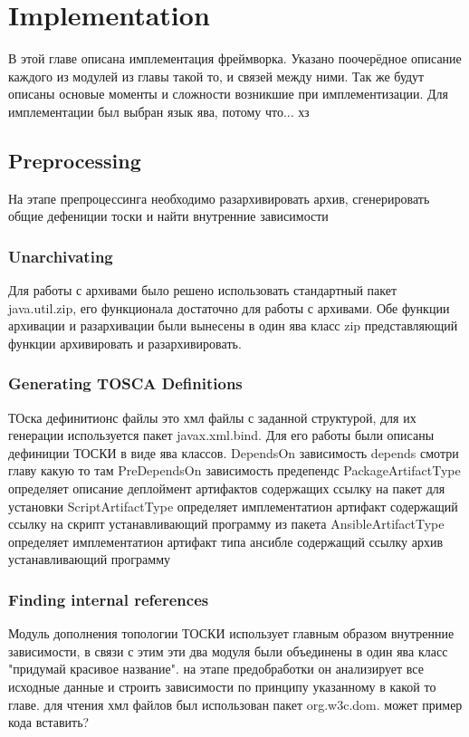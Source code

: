 
\chapter{Implementation}\label{chap:imp}

В этой главе описана имплементация фреймворка. Указано поочерёдное описание каждого из модулей из главы такой то, и связей между ними. Так же будут описаны основые моменты и сложности возникшие при имплементизации.
Для имплементации был выбран язык ява, потому что... хз
\fi
\section{Preprocessing}
На этапе препроцессинга необходимо разархивировать архив, сгенерировать общие дефениции тоски и найти внутренние зависимости
\fi
\subsection*{Unarchivating}
Для работы с архивами было решено использовать стандартный пакет java.util.zip, его функционала достаточно для работы с архивами. Обе функции архивации и разархивации были вынесены в один ява класс zip представляющий функции архивировать и разархивировать. 
\fi
\subsection*{Generating TOSCA Definitions}
ТОска дефинитионс файлы это хмл файлы с заданной структурой, для их генерации  используется пакет javax.xml.bind. Для его работы были описаны дефиниции ТОСКИ в виде ява классов. 
DependsOn зависимость depends смотри главу какую то там
PreDependsOn зависимость предепендс
PackageArtifactType определяет описание деплоймент артифактов содержащих ссылку на пакет для установки 
ScriptArtifactType  определяет имплементатион артифакт содержащий ссылку на скрипт устанавливающий программу из пакета 
AnsibleArtifactType  определяет имплементатион артифакт типа ансибле содержащий ссылку архив устанавливающий программу 
\fi
\subsection*{Finding internal references}
Модуль дополнения топологии ТОСКИ использует главным образом внутренние зависимости, в связи с этим эти два модуля были объединены в один ява класс "придумай красивое название". на этапе предобработки он анализирует все исходные данные и строить зависимости по принципу указанному в какой то главе. для чтения хмл файлов был использован пакет org.w3c.dom. может пример кода вставить?

